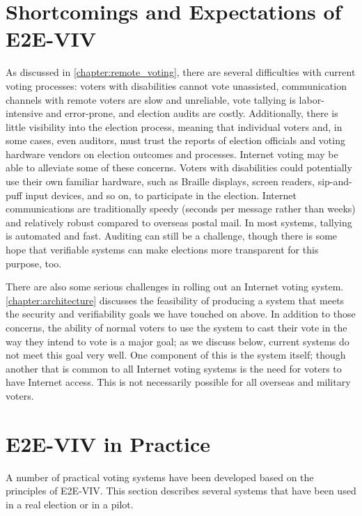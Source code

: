 \section{Shortcomings and Expectations of E2E-VIV}

As discussed in \autoref{chapter:remote_voting}, there are several
difficulties with current voting processes: voters with disabilities cannot
vote unassisted, communication channels with remote voters are slow and
unreliable, vote tallying is labor-intensive and error-prone, and
election audits are costly. Additionally, there is little visibility into
the election process, meaning that individual voters and, in some cases,
even auditors, must trust the reports of election officials and voting
hardware vendors on election outcomes and processes. Internet voting may be
able to alleviate some of these concerns. Voters with disabilities could
potentially use their own familiar hardware, such as Braille displays,
screen readers, sip-and-puff input devices, and so on, to participate in the
election. Internet communications are traditionally speedy (seconds per
message rather than weeks) and relatively robust compared to overseas postal
mail. In most systems, tallying is automated and fast. Auditing can still be
a challenge, though there is some hope that verifiable systems can make
elections more transparent for this purpose, too.

There are also some serious challenges in rolling out an Internet voting
system. \autoref{chapter:architecture} discusses the feasibility of
producing a system that meets the security and verifiability goals we have
touched on above. In addition to those concerns, the ability of normal
voters to use the system to cast their vote in the way they intend to vote
is a major goal; as we discuss below, current systems do not meet this goal
very well. One component of this is the system itself; though another that
is common to all Internet voting systems is the need for voters to have
Internet access. This is not necessarily possible for all overseas and
military voters.

\section{E2E-VIV in Practice}

A number of practical voting systems have been developed based on the
principles of E2E-VIV. This section describes several systems that
have been used in a real election or in a pilot.


